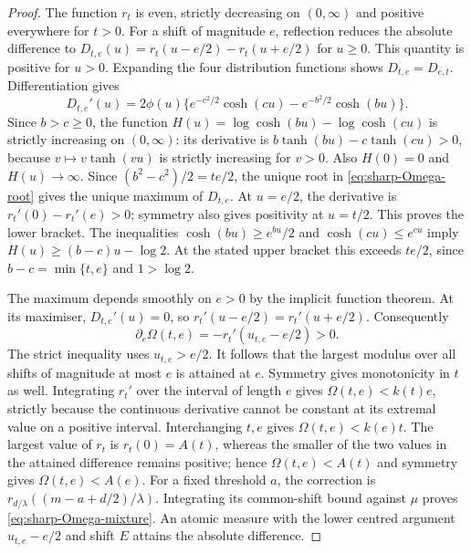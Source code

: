 \begin{proof}
The function $r_t$ is even, strictly decreasing on $(0,\infty)$ and
positive everywhere for $t>0$. For a shift of magnitude $e$, reflection
reduces the absolute difference to
$D_{t,e}(u)=r_t(u-e/2)-r_t(u+e/2)$ for $u\geq0$. This quantity is
positive for $u>0$. Expanding the four distribution functions shows
$D_{t,e}=D_{e,t}$. Differentiation gives
\begin{equation}
 D_{t,e}'(u)=2\phi(u)\{
 e^{-c^2/2}\cosh(cu)-e^{-b^2/2}\cosh(bu)\}.
 \label{eq:sharp-Omega-derivative}
\end{equation}
Since $b>c\geq0$, the function
$H(u)=\log\cosh(bu)-\log\cosh(cu)$ is strictly increasing on
$(0,\infty)$: its derivative is
$b\tanh(bu)-c\tanh(cu)>0$, because $v\mapsto v\tanh(vu)$ is
strictly increasing for $v>0$. Also $H(0)=0$ and $H(u)\to\infty$.
Since $(b^2-c^2)/2=te/2$, the unique root in
\eqref{eq:sharp-Omega-root} gives the unique maximum of $D_{t,e}$.
At $u=e/2$, the derivative is $r_t'(0)-r_t'(e)>0$; symmetry also
gives positivity at $u=t/2$. This proves the lower bracket.
The inequalities $\cosh(bu)\geq e^{bu}/2$ and
$\cosh(cu)\leq e^{cu}$ imply
$H(u)\geq(b-c)u-\log2$. At the stated upper bracket this exceeds
$te/2$, since $b-c=\min\{t,e\}$ and $1>\log2$.

The maximum depends smoothly on $e>0$ by the implicit function
theorem. At its maximiser, $D_{t,e}'(u)=0$, so
$r_t'(u-e/2)=r_t'(u+e/2)$. Consequently
\begin{equation}
 \partial_e\Omega(t,e)
   =-r_t'(u_{t,e}-e/2)>0.
 \label{eq:sharp-Omega-monotonicity}
\end{equation}
The strict inequality uses $u_{t,e}>e/2$. It follows that the largest
modulus over all shifts of magnitude at most $e$ is attained at $e$.
Symmetry gives monotonicity in $t$ as well. Integrating $r_t'$ over
the interval of length $e$ gives $\Omega(t,e)<k(t)e$, strictly because
the continuous derivative cannot be constant at its extremal value on
a positive interval. Interchanging $t,e$ gives $\Omega(t,e)<k(e)t$.
The largest value of $r_t$ is $r_t(0)=A(t)$, whereas the smaller
of the two values in the attained difference remains positive; hence
$\Omega(t,e)<A(t)$ and symmetry gives $\Omega(t,e)<A(e)$.
For a fixed threshold $a$, the correction is
$r_{d/\lambda}((m-a+d/2)/\lambda)$. Integrating its common-shift
bound against $\mu$ proves \eqref{eq:sharp-Omega-mixture}.
An atomic measure with the lower centred argument
$u_{t,e}-e/2$ and shift $E$ attains the absolute difference.
\end{proof}

